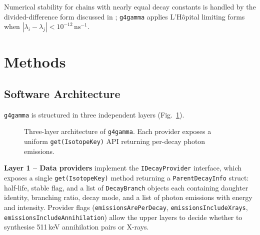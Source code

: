 \documentclass[journal]{IEEEtran}
\begin{document}
Numerical stability for chains with nearly equal decay constants is handled by
the divided-difference form discussed in \cite{Pressyanov2002,CruzLopez2024};
\texttt{g4gamma} applies L'H\^opital limiting forms when
$|\lambda_i - \lambda_j| < 10^{-12}\,\text{ns}^{-1}$.

\section{Methods}

\subsection{Software Architecture}

\texttt{g4gamma} is structured in three independent layers (Fig.~\ref{fig:architecture}).

\begin{figure}[!t]
  \centering
  \caption{Three-layer architecture of \texttt{g4gamma}. Each provider exposes a
    uniform \texttt{get(IsotopeKey)} API returning per-decay photon emissions.}
  \label{fig:architecture}
\end{figure}

\textbf{Layer 1 -- Data providers} implement the \texttt{IDecayProvider} interface,
which exposes a single \texttt{get(IsotopeKey)} method returning a
\texttt{ParentDecayInfo} struct: half-life, stable flag, and a list of
\texttt{DecayBranch} objects each containing daughter identity, branching ratio,
decay mode, and a list of photon emissions with energy and intensity.
Provider flags (\texttt{emissionsArePerDecay}, \texttt{emissionsIncludeXrays},
\texttt{emissionsIncludeAnnihilation}) allow the upper layers to decide whether
to synthesise 511\,keV annihilation pairs or X-rays.
\end{document}
